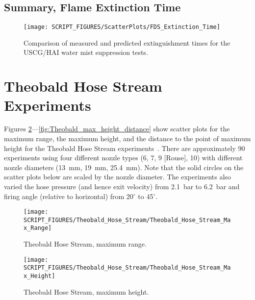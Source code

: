 \clearpage

\subsection{Summary, Flame Extinction Time}
\label{Extinction Time}

\begin{figure}[h!]
\begin{center}
\texttt{[image: SCRIPT\_FIGURES/ScatterPlots/FDS\_Extinction\_Time]}
\caption[Extinguishment times for the USCG/HAI water mist suppression tests]{Comparison of measured and predicted extinguishment times for the USCG/HAI water mist suppression tests.}
\label{USCG_Scatter}
\end{center}
\end{figure}

\clearpage

\section{Theobald Hose Stream Experiments}

Figures \ref{fig:Theobald_max_range}---\ref{fig:Theobald_max_height_distance} show scatter plots for the maximum range, the maximum height, and the distance to the point of maximum height for the Theobald Hose Stream experiments~\cite{Theobald:1981}.  There are approximately 90 experiments using four different nozzle types (6, 7, 9 [Rouse], 10) with different nozzle diameters (13~mm, 19~mm, 25.4~mm).  Note that the solid circles on the scatter plots below are scaled by the nozzle diameter.  The experiments also varied the hose pressure (and hence exit velocity) from 2.1~bar to 6.2~bar and firing angle (relative to horizontal) from 20$^\circ$ to 45$^\circ$.

\begin{figure}[h!]
\begin{center}
\texttt{[image: SCRIPT\_FIGURES/Theobald\_Hose\_Stream/Theobald\_Hose\_Stream\_Max\_Range]}
\caption[Theobald Hose Stream max range]{Theobald Hose Stream, maximum range.}
\label{fig:Theobald_max_range}
\end{center}
\end{figure}

\begin{figure}[!ht]
\begin{center}
\texttt{[image: SCRIPT\_FIGURES/Theobald\_Hose\_Stream/Theobald\_Hose\_Stream\_Max\_Height]}
\caption[Theobald Hose Stream max height]{Theobald Hose Stream, maximum height.}
\label{fig:Theobald_max_height}
\end{center}
\end{figure}

